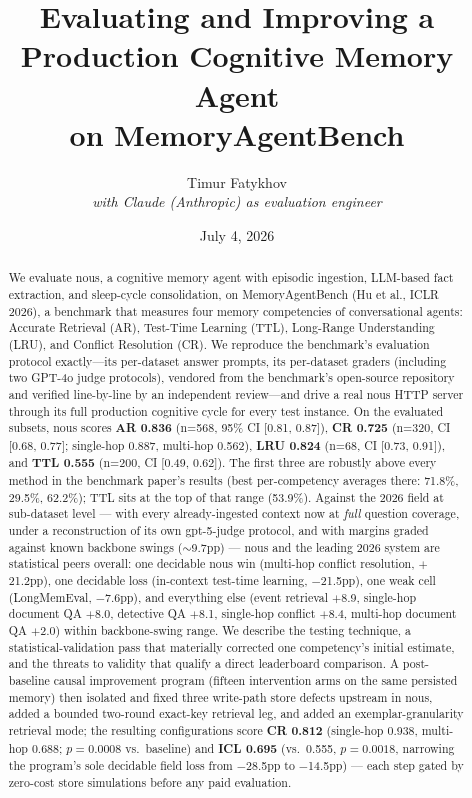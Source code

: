 \documentclass{article}
\title{\textbf{Evaluating and Improving a Production Cognitive Memory Agent\\on MemoryAgentBench}}
\author{Timur Fatykhov\\\small\textit{with Claude (Anthropic) as evaluation engineer}}
\date{July 4, 2026}
\newcommand{\nous}{\textsf{nous}}
\newcommand{\mab}{MemoryAgentBench}
\begin{document}
\maketitle

\begin{abstract}
\noindent We evaluate \nous{}, a cognitive memory agent with episodic ingestion,
LLM-based fact extraction, and sleep-cycle consolidation, on \mab{}
(Hu et al., ICLR 2026), a benchmark that measures four memory competencies of
conversational agents: Accurate Retrieval (AR), Test-Time Learning (TTL),
Long-Range Understanding (LRU), and Conflict Resolution (CR).
We reproduce the benchmark's evaluation protocol exactly---its per-dataset answer
prompts, its per-dataset graders (including two GPT-4o judge protocols), vendored
from the benchmark's open-source repository and verified line-by-line by an
independent review---and drive a real \nous{} HTTP server through its full
production cognitive cycle for every test instance.
On the evaluated subsets, \nous{} scores
\textbf{AR 0.836} (n=568, 95\% CI [0.81, 0.87]),
\textbf{CR 0.725} (n=320, CI [0.68, 0.77]; single-hop 0.887, multi-hop 0.562),
\textbf{LRU 0.824} (n=68, CI [0.73, 0.91]),
and \textbf{TTL 0.555} (n=200, CI [0.49, 0.62]).
The first three are robustly above every method in the benchmark paper's
results (best per-competency averages there: 71.8\%, 29.5\%, 62.2\%); TTL sits
at the top of that range (53.9\%). Against the 2026 field at sub-dataset
level --- with every already-ingested context now at \emph{full} question
coverage, under a reconstruction of its own gpt-5-judge protocol, and with
margins graded against known backbone swings ($\sim$9.7pp) --- \nous{} and
the leading 2026 system are statistical peers overall: one decidable \nous{}
win (multi-hop conflict resolution, $+$21.2pp), one decidable loss
(in-context test-time learning, $-$21.5pp), one weak cell (LongMemEval,
$-$7.6pp), and everything else (event retrieval $+$8.9, single-hop document
QA $+$8.0, detective QA $+$8.1, single-hop conflict $+$8.4, multi-hop
document QA $+$2.0) within backbone-swing range.
We describe the testing technique, a statistical-validation pass that materially
corrected one competency's initial estimate, and the threats to validity that
qualify a direct leaderboard comparison.
A post-baseline causal improvement program (fifteen intervention arms on the
same persisted memory) then isolated and fixed three write-path store defects
upstream in \nous{}, added a bounded two-round exact-key retrieval leg, and
added an exemplar-granularity retrieval mode; the resulting configurations
score \textbf{CR 0.812} (single-hop 0.938, multi-hop 0.688; $p{=}0.0008$ vs.\
baseline) and \textbf{ICL 0.695} (vs.\ 0.555, $p{=}0.0018$, narrowing the
program's sole decidable field loss from $-$28.5pp to $-$14.5pp) --- each
step gated by zero-cost store simulations before any paid evaluation.
\end{abstract}
\end{document}
